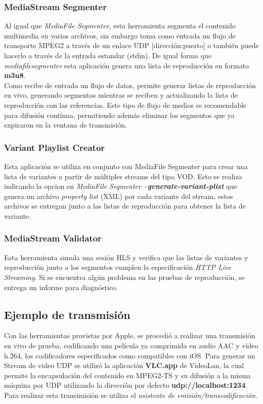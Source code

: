 		\subsubsection{MediaStream Segmenter}
Al igual que \textit{MediaFile Segmenter}, esta herramienta segmenta el contenido multimedia en varios archivos, sin embargo toma como entrada un flujo de transporte MPEG2 a través de un enlace UDP [dirección:puerto] o también puede hacerlo a través de la entrada estandar (stdin). De igual forma que \textit{mediafilesegmenter} esta aplicación genera una lista de reproducción en formato \textbf{m3u8}.\\

Como recibe de entrada un flujo de datos, permite generar listas de reproducción en vivo, generando segmentos mientras se reciben y actualizando la lista de reproducción con las referencias. Este tipo de flujo de medios es recomendable para difusión contínua, permitiendo además eliminar los segmentos que ya expiraron en la ventana de transmisión.

		\subsubsection{Variant Playlist Creator}
		Esta aplicación se utiliza en conjunto con MediaFile Segmenter para crear una lista de variantes a partir de múltiples streams del tipo VOD. Esto se realiza indicando la opcion en \textit{MediaFile Segmenter} \textit{\textbf{--generate-variant-plist}} que genera un archivo \textit{property list} (XML) por cada variante del stream, estos archivos se entregan junto a las listas de reproducción para obtener la lista de variante.
			
		\subsubsection{MediaStream Validator}		
		Esta herramienta simula una sesión HLS y verifica que las listas de variantes y reproducción junto a los segmentos cumplen la especificación \textit{HTTP Live Streaming}. Si se encuentra algún problema en las pruebas de reproducción, se entrega un informe para diagnóstico.
		
	\subsection{Ejemplo de transmisión}

Con las herramientas provistas por Apple, se procedió a realizar una transmisión en vivo de prueba, codificando una película ya comprimida en audio AAC y video h.264, los codificadores especificados como compatibles con iOS. Para generar un Stream de video UDP se utilizó la aplicación \textbf{VLC.app} de VideoLan, la cual permite la encapsulación del contenido en MPEG2-TS y su difusión a la misma máquina por UDP utilizando la dirección por defecto \textbf{udp://localhost:1234}. Para realizar esta transimisión se utiliza el \textit{asistente de emisión/transcodificación}.\\

